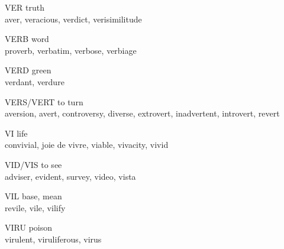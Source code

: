 \begin{flashcard}[Roots]{VER}
truth\\
\vspace{0.2in}
aver, veracious, verdict, verisimilitude\\
\end{flashcard}

\begin{flashcard}[Roots]{VERB}
word\\
\vspace{0.2in}
proverb, verbatim, verbose, verbiage\\
\end{flashcard}

\begin{flashcard}[Roots]{VERD}
green\\
\vspace{0.2in}
verdant, verdure\\
\end{flashcard}

\begin{flashcard}[Roots]{VERS/VERT}
to turn\\
\vspace{0.2in}
aversion, avert, controversy, diverse, extrovert, inadvertent, introvert, revert\\
\end{flashcard}

\begin{flashcard}[Roots]{VI}
life\\
\vspace{0.2in}
convivial, joie de vivre, viable, vivacity, vivid\\
\end{flashcard}

\begin{flashcard}[Roots]{VID/VIS}
to see\\
\vspace{0.2in}
adviser, evident, survey, video, vista\\
\end{flashcard}

\begin{flashcard}[Roots]{VIL}
base, mean\\
\vspace{0.2in}
revile, vile, vilify\\
\end{flashcard}

\begin{flashcard}[Roots]{VIRU}
poison\\
\vspace{0.2in}
virulent, viruliferous, virus\\
\end{flashcard}

